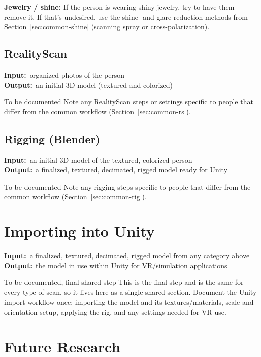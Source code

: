 \documentclass[11pt]{article}
\newcommand{\inout}[2]{%
    \begin{stageio}%
    \textbf{Input:}~#1\\[2pt]%
    \textbf{Output:}~#2%
    \end{stageio}%
}
\begin{document}
\textbf{Jewelry / shine:} If the person is wearing shiny jewelry, try to have them remove it. If that's undesired, use the shine- and glare-reduction methods from Section~\ref{sec:common-shine} (scanning spray or cross-polarization).

\subsection{RealityScan}
\inout{organized photos of the person}{an initial 3D model (textured and colorized)}
\begin{todobox}{To be documented}
Note any RealityScan steps or settings specific to people that differ from the common workflow (Section~\ref{sec:common-rs}).
\end{todobox}

\subsection{Rigging (Blender)}
\inout{an initial 3D model of the textured, colorized person}{a finalized, textured, decimated, rigged model ready for Unity}
\begin{todobox}{To be documented}
Note any rigging steps specific to people that differ from the common workflow (Section~\ref{sec:common-rig}).
\end{todobox}

\section{Importing into Unity}
\inout{a finalized, textured, decimated, rigged model from any category above}{the model in use within Unity for VR/simulation applications}
\begin{todobox}{To be documented, final shared step}
This is the final step and is the same for every type of scan, so it lives here as a single shared section. Document the Unity import workflow once: importing the model and its textures/materials, scale and orientation setup, applying the rig, and any settings needed for VR use.
\end{todobox}

\section{Future Research}
\label{sec:future}
\end{document}
